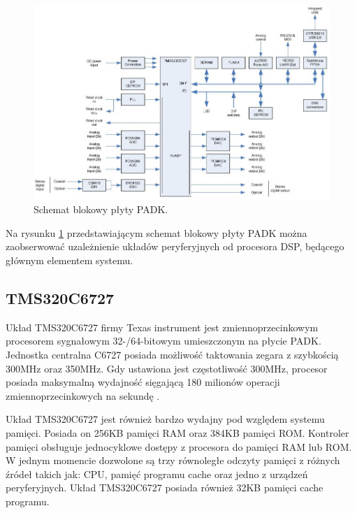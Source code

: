 \begin{figure}[H]
	\centering
	\includegraphics[width=16cm]{./grafiki/real_PADK_block}
	\captionsetup{justification=centering}
	\caption{Schemat blokowy płyty PADK.}
	\label{rys:real_padk}
\end{figure}

Na rysunku \ref{rys:real_padk} przedstawiającym schemat blokowy płyty PADK można zaobserwować uzależnienie układów peryferyjnych od procesora DSP, będącego głównym elementem systemu.

\subsection{TMS320C6727}
Układ TMS320C6727 firmy Texas instrument jest zmiennoprzecinkowym procesorem sygnałowym 32-/64-bitowym umieszczonym na płycie PADK. Jednostka centralna C6727 posiada możliwość taktowania zegara z szybkością 300MHz oraz 350MHz. Gdy ustawiona jest częstotliwość 300MHz, procesor posiada maksymalną wydajność sięgającą 180 milionów operacji zmiennoprzecinkowych na sekundę \cite{dokumentacja_ti6727}.

Układ TMS320C6727 jest również bardzo wydajny pod względem systemu pamięci. Posiada on 256KB pamięci RAM oraz 384KB pamięci ROM. Kontroler pamięci obsługuje jednocyklowe dostępy z procesora do pamięci  RAM lub ROM. W jednym momencie dozwolone są trzy równoległe odczyty pamięci z różnych źródeł takich jak: CPU, pamięć programu cache oraz jedno z urządzeń peryferyjnych. Układ TMS320C6727 posiada również 32KB pamięci cache programu.


